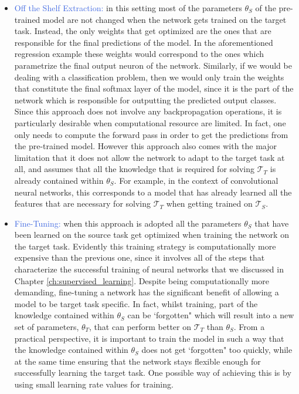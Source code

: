 \begin{itemize}
	\item \textcolor{RoyalBlue}{Off the Shelf Extraction:} in this setting most of the parameters $\theta_S$ of the pre-trained model are not changed when the network gets trained on the target task. Instead, the only weights that get optimized are the ones that are responsible for the final predictions of the model. In the aforementioned regression example these weights would correspond to the ones which parametrize the final output neuron of the network. Similarly, if we would be dealing with a classification problem, then we would only train the weights that constitute the final softmax layer of the model, since it is the part of the network which is responsible for outputting the predicted output classes. Since this approach does not involve any backpropagation operations, it is particularly desirable when computational resource are limited. In fact, one only needs to compute the forward pass in order to get the predictions from the pre-trained model. However this approach also comes with the major limitation that it does not allow the network to adapt to the target task at all, and assumes that all the knowledge that is required for solving $\mathcal{T}_T$ is already contained within $\theta_S$. For example, in the context of convolutional neural networks, this corresponds to a model that has already learned all the features that are necessary for solving $\mathcal{T}_T$ when getting trained on $\mathcal{T}_S$.   

	\item \textcolor{RoyalBlue}{Fine-Tuning:} when this approach is adopted all the parameters $\theta_S$ that have been learned on the source task get optimized when training the network on the target task. Evidently this training strategy is computationally more expensive than the previous one, since it involves all of the steps that characterize the successful training of neural networks that we discussed in Chapter \ref{ch:supervised_learning}. Despite being computationally more demanding, fine-tuning a network has the significant benefit of allowing a model to be target task specific. In fact, whilst training, part of the knowledge contained within $\theta_S$ can be `forgotten" which will result into a new set of parameters, $\theta_T$, that can perform better on $\mathcal{T}_T$ than $\theta_S$. From a practical perspective, it is important to train the model in such a way that the knowledge contained within $\theta_S$ does not get `forgotten" too quickly, while at the same time ensuring that the network stays flexible enough for successfully learning the target task. One possible way of achieving this is by using small learning rate values for training.      
\end{itemize}


